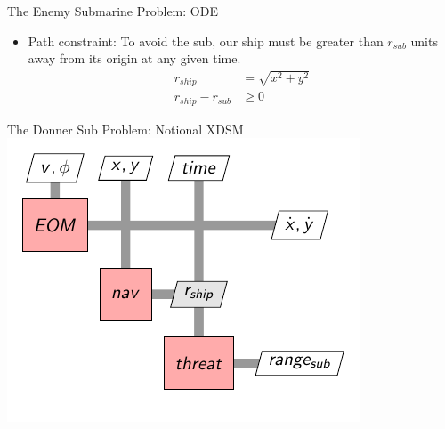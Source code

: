 \documentclass[aspectratio=169, usenames,dvipsnames, 14pt]{beamer}
\begin{document}
\begin{frame}{The Enemy Submarine Problem: ODE}
    \begin{itemize}
      \item Path constraint:  To avoid the sub, our ship must be greater than $r_{sub}$ units away from its origin at any given time.
      \begin{align*}
      r_{ship} &= \sqrt{x^2 + y^2}\\
      r_{ship} - r_{sub} &\ge 0
      \end{align*}
    \end{itemize}
\end{frame}


\begin{frame}{The Donner Sub Problem: Notional XDSM}
    \centering
    \includegraphics[scale=1.0]{images/donner_sub/donner_sub_ode_xdsm}
\end{frame}
\end{document}
